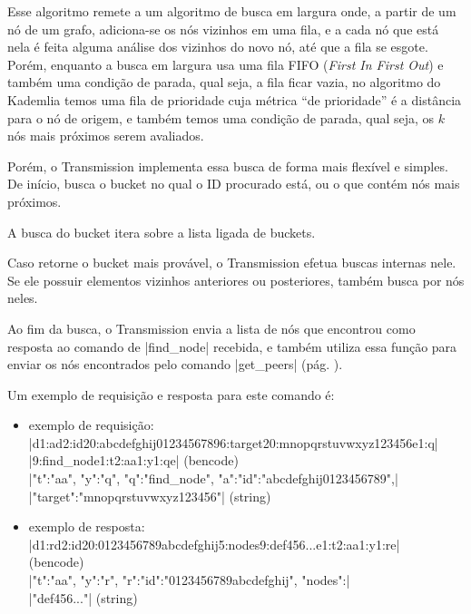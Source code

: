 Esse algoritmo remete a um algoritmo de busca em largura onde, a partir de um nó de um
grafo, adiciona-se os nós vizinhos em uma fila, e a cada nó que está nela é feita alguma
análise dos vizinhos do novo nó, até que a fila se esgote. Porém, enquanto a busca em
largura usa uma fila FIFO (\emph{First In First Out}) e também uma condição de parada,
qual seja, a fila ficar vazia, no algoritmo do Kademlia temos uma fila de prioridade
cuja métrica ``de prioridade'' é a distância para o nó de origem, e também temos uma
condição de parada, qual seja, os $k$ nós mais próximos serem avaliados.

Porém, o Transmission implementa essa busca de forma mais flexível e simples. De início,
busca o \gls*{bucket} no qual o ID procurado está, ou o que contém nós mais próximos.


A busca do \gls*{bucket} itera sobre a lista ligada de \glspl*{bucket}.


Caso retorne o \gls*{bucket} mais provável, o Transmission efetua buscas internas nele.
Se ele possuir elementos vizinhos anteriores ou posteriores, também busca por nós neles.


Ao fim da busca, o Transmission envia a lista de nós que encontrou como resposta ao
comando de \sverb|find_node| recebida, e também utiliza essa função para enviar os nós
encontrados pelo comando \sverb|get_peers| (pág. \pageref{subsubsubsec:getpeers}).


Um exemplo de requisição e resposta para este comando é:

\begin{itemize}
    \item exemplo de requisição: \\
        \bverb|d1:ad2:id20:abcdefghij01234567896:target20:mnopqrstuvwxyz123456e1:q| \\
        \bverb|9:find_node1:t2:aa1:y1:qe| (\gls*{bencode}) \\
        \sverb|{"t":"aa", "y":"q", "q":"find_node", "a":{"id":"abcdefghij0123456789",| \\
        \sverb|"target":"mnopqrstuvwxyz123456"}}| (\gls*{string})

    \item exemplo de resposta: \\
        \bverb|d1:rd2:id20:0123456789abcdefghij5:nodes9:def456...e1:t2:aa1:y1:re| \\
        (\gls*{bencode}) \\
        \sverb|{"t":"aa", "y":"r", "r":{"id":"0123456789abcdefghij", "nodes":| \\
        \sverb|"def456..."}}| (\gls*{string})
\end{itemize}